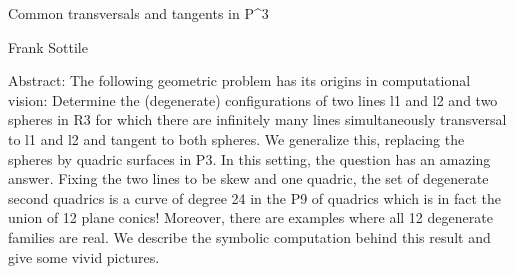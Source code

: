 \documentclass[12pt]{article}
\begin{document}
Common transversals and tangents in P^3

Frank Sottile

Abstract: The following geometric problem has its origins in
computational vision: Determine the (degenerate) configurations of two
lines l1 and l2 and two spheres in R3 for which there are infinitely
many lines simultaneously transversal to l1 and l2 and tangent to both
spheres. We generalize this, replacing the spheres by quadric surfaces
in P3. In this setting, the question has an amazing answer. Fixing the
two lines to be skew and one quadric, the set of degenerate second
quadrics is a curve of degree 24 in the P9 of quadrics which is in
fact the union of 12 plane conics! Moreover, there are examples where
all 12 degenerate families are real. We describe the symbolic
computation behind this result and give some vivid pictures.
\end{document}
